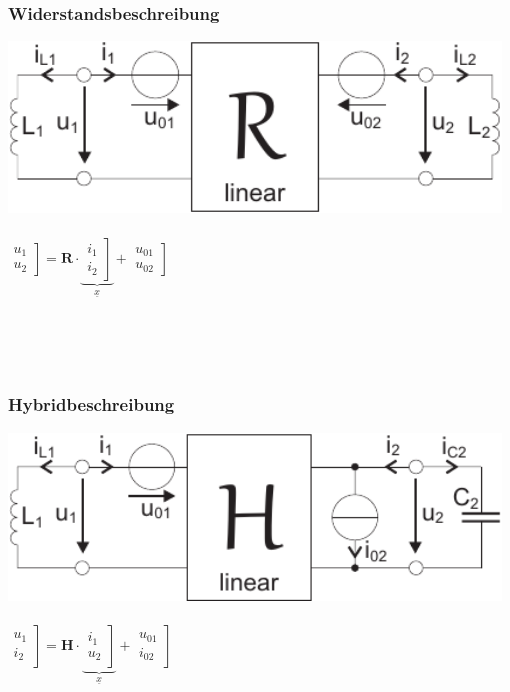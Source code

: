\documentclass[a4paper,twocolumn,10pt]{article}
\begin{document}
\begin{minipage}[t]{0.23\textwidth}
\subsubsection*{Widerstandsbeschreibung}
\includegraphics[width=0.98\textwidth]{img/ESBzweitenGrades2}\\\\
$\left.\begin{matrix}u_1 \\ u_2\end{matrix}\right]=\textbf{R}\cdot \underbrace{\left.\begin{matrix}i_1 \\ i_2\end{matrix}\right]}_{\underline{x}}+\left.\begin{matrix}u_{01} \\ u_{02}\end{matrix}\right]$
\end{minipage}\\\\\\
\begin{minipage}[t]{0.23\textwidth}
\subsubsection*{Hybridbeschreibung}
\includegraphics[width=0.98\textwidth]{img/ESBzweitenGrades3}\\\\
$\left.\begin{matrix}u_1 \\ i_2\end{matrix}\right]=\textbf{H}\cdot \underbrace{\left.\begin{matrix}i_1 \\ u_2\end{matrix}\right]}_{\underline{x}}+\left.\begin{matrix}u_{01} \\ i_{02}\end{matrix}\right]$
\end{minipage}
\end{document}
